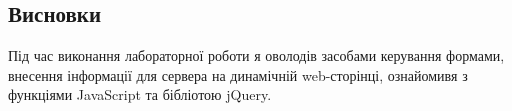 \documentclass{article}
\begin{document}
\begin{normalsize}
\section*{Висновки}
Під час виконання лабораторної роботи я оволодів засобами керування формами, внесення інформації для сервера на
динамічній web-сторінці, ознайомивя з функціями JavaScript та бібліотою jQuery.
	    
\end{normalsize}
\end{document}
